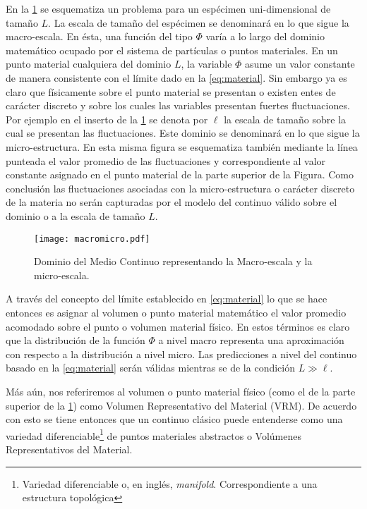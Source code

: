 \documentclass[../notas medios.tex]{subfiles}
\begin{document}
En la \cref{fig:macromicro} se esquematiza un problema para un espécimen
uni-dimensional de tamaño $L$.  La escala de tamaño del espécimen se denominará 
en lo que sigue la macro-escala.  En ésta, una función del tipo $\Phi$ varía a 
lo largo del dominio matemático ocupado por el sistema de partículas o puntos 
materiales.  En un punto material cualquiera del dominio $L$, la variable 
$\Phi$ asume un valor constante de manera consistente con el límite dado en la 
\cref{eq:material}. Sin embargo ya es claro que físicamente sobre el punto 
material se presentan o existen entes de carácter discreto y sobre los cuales 
las variables presentan fuertes fluctuaciones.  Por ejemplo en el inserto de la 
\cref{fig:macromicro} se denota por $\ell$ la escala de tamaño sobre la cual se 
presentan las fluctuaciones.  Este dominio se denominará en lo que sigue la 
micro-estructura.  En esta misma figura se esquematiza también mediante la 
línea punteada el valor promedio de las fluctuaciones y correspondiente al 
valor constante asignado en el punto material de la parte superior de la 
Figura.  Como conclusión las fluctuaciones asociadas con la micro-estructura o 
carácter discreto de la materia no serán capturadas por el modelo del continuo 
válido sobre el dominio o a la escala de tamaño $L$.
\begin{figure}[H]
\centering
\texttt{[image: macromicro.pdf]}
\caption{Dominio del Medio Continuo representando la Macro-escala y la 
micro-escala.}
\label{fig:macromicro}
\end{figure}


A través del concepto del límite establecido en \cref{eq:material} lo que se 
hace entonces es asignar al volumen o punto material matemático el valor 
promedio acomodado sobre el punto o volumen material físico.  En estos términos 
es claro que la distribución de la función $\Phi$ a nivel macro representa una 
aproximación con respecto a la distribución a nivel micro.  Las predicciones a 
nivel del continuo basado en la \cref{eq:material} serán válidas mientras se de 
la condición $L \gg \ell $.

Más aún, nos referiremos al volumen o punto material físico (como el de la 
parte superior de la \cref{fig:macromicro}) como Volumen Representativo del 
Material (VRM).  De acuerdo con esto se tiene entonces que un continuo clásico 
puede entenderse como una variedad diferenciable\footnote{Variedad 
diferenciable o, en inglés, \emph{manifold}.  Correspondiente a una 
estructura topológica} de puntos materiales abstractos o Volúmenes 
Representativos del Material.
\end{document}
